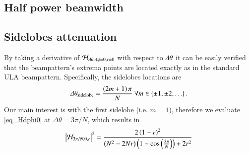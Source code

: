 \subsection*{Half power beamwidth}

\subsection*{Sidelobes attenuation}
\ifdefined\showDev
\else
\fi
By taking a derivative of $\Hr_{\Delta\theta,\Delta\phi=0,r=0}\omegaB$ with respect to $\dTheta$ it can be easily verified that the beampattern's extrema points are located exactly as in the standard ULA beampattern. Specifically, the sidelobes locations are
\begin{equation}
    \label{eqn_CB_sidelobesLocations}
    \Delta\theta_{\text{sidelobe}} = \frac{\rBrace{2m+1}\pi}{N}\ \forall m\in\cBrace{\pm 1,\pm 2,\hdots}.
\end{equation}
Our main interest is with the first sidelobe (i.e. $m=1$), therefore we evaluate \eqref{eq_Hdphi0} at $\Delta\theta = 3\pi/N$, which results in
\begin{equation}
    \abs{\Hr_{{3\pi}/{N},0,r}\omegaB}^2
    =
    \frac{
    2\rBrace{1-r}^{2}
    }{
    \rBrace{N^{2}-2Nr}\rBrace{1-\cos{\rBrace{\frac{3\pi}{N}}}}+2r^{2}
    }
    \label{eq_HSidelobes}
\end{equation}
